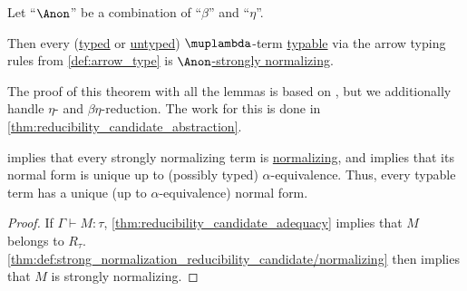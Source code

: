 \begin{theorem}\label{thm:simply_typable_terms_are_strongly_normalizing}
  Let \enquote{\( {\Anon} \)} be a combination of \enquote{\( \beta \)} and \enquote{\( \eta \)}.

  Then every (\hyperref[def:typed_lambda_term]{typed} or \hyperref[def:lambda_term]{untyped}) \( \muplambda \)-term \hyperref[def:typability]{typable} via the arrow typing rules from \cref{def:arrow_type} is \hyperref[def:strongly_normalizing_lambda_term]{\( \Anon \)-strongly normalizing}.
\end{theorem}
\begin{comments}
  \item The proof of this theorem with all the lemmas is based on \cite[thm. 4.2.2.5]{Mimram2020ProgramEqualsProof}, but we additionally handle \( \eta \)- and \( \beta\eta \)-reduction. The work for this is done in \cref{thm:reducibility_candidate_abstraction}.

  \item {} implies that every strongly normalizing term is \hyperref[def:lambda_term_normal_form]{normalizing}, and  implies that its normal form is unique up to (possibly typed) \( \alpha \)-equivalence. Thus, every typable term has a unique (up to \( \alpha \)-equivalence) normal form.
\end{comments}
\begin{proof}
  If \( \Gamma \vdash M: \tau \), \cref{thm:reducibility_candidate_adequacy} implies that \( M \) belongs to \( R_\tau \). \ref{thm:def:strong_normalization_reducibility_candidate/normalizing} then implies that \( M \) is strongly normalizing.
\end{proof}
